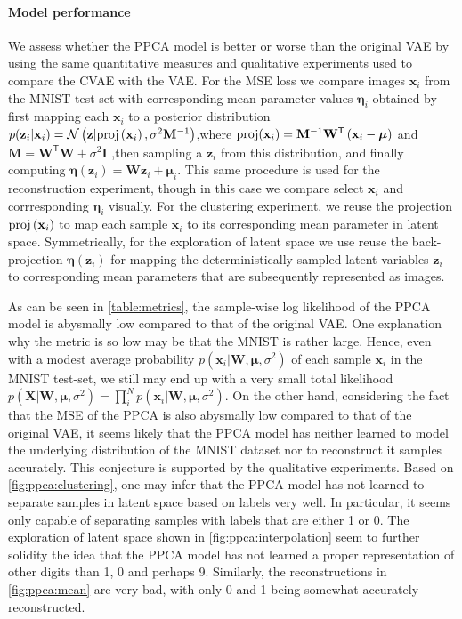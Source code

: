 \paragraph{Model performance}
We assess whether the PPCA model is better or worse than the original VAE by using the same quantitative measures and qualitative experiments used to compare the CVAE with the VAE\@. For the MSE loss we compare images $\mathbf{x}_i$ from the MNIST test set with corresponding mean parameter values $\bm{\eta}_i$ obtained by first mapping each $\mathbf{x}_i$ to a posterior distribution $p(\mathbf{z}_i|\mathbf{x}_i) = \mathcal{N}\left (\mathbf{z}| \text{proj}\left (\mathbf{x}_i\right), \sigma^2 \mathbf{M}^{-1}\right)$,where  $\text{proj}(\mathbf{x}_i) = \mathbf{M}^{-1} \mathbf{W}^{\mathsf{T}}\left (\mathbf{x}_i - \bm{\mu}\right)$ and $\mathbf{M} = \mathbf{W}^{\mathsf{T}}\mathbf{W} + \sigma^2 \mathbf{I}$ ,then sampling a $\mathbf{z}_i$ from this distribution, and finally computing $\bm{\eta}(\mathbf{z}_i) = \mathbf{W}\mathbf{z}_i + \bm{\mu}_i$. This same procedure is used for the reconstruction experiment, though in this case we compare select $\mathbf{x}_i$ and corrresponding $\bm{\eta}_i$ visually. For the clustering experiment, we reuse the projection  $\text{proj}\left (\mathbf{x}_i\right)$ to map each sample $\mathbf{x}_i$ to its corresponding mean parameter in latent space. Symmetrically, for the exploration of latent space we use reuse the back-projection $\bm{\eta}(\mathbf{z}_i)$ for mapping the deterministically sampled latent variables $\mathbf{z}_i$ to corresponding mean parameters that are subsequently represented as images.

As can be seen in \cref{table:metrics}, the sample-wise log likelihood of the PPCA model is abysmally low compared to that of the original VAE\@. One explanation why the metric is so low may be that the MNIST is rather large. Hence, even with a modest average probability $p(\mathbf{x}_i | \mathbf{W}, \bm{\mu}, \sigma^2)$ of each sample $\mathbf{x}_i$ in the MNIST test-set, we still may end up with a very small total likelihood $p(\mathbf{X}|\mathbf{W}, \bm{\mu}, \sigma^2 ) = \prod_{i}^{N}p(\mathbf{x}_i | \mathbf{W}, \bm{\mu}, \sigma^2)$. On the other hand, considering the fact that the MSE of the PPCA is also abysmally low compared to that of the original VAE, it seems likely that the PPCA model has neither learned to model the underlying distribution of the MNIST dataset nor to reconstruct it samples accurately. This conjecture is supported by the qualitative experiments. Based on \cref{fig:ppca:clustering}, one may infer that the PPCA model has not learned to separate samples in latent space based on labels very well. In particular, it seems only capable of separating samples with labels that are either 1 or 0. The exploration of latent space shown in \cref{fig:ppca:interpolation} seem to further solidity the idea that the PPCA model has not learned a proper representation of other digits than 1, 0 and perhaps 9. Similarly, the reconstructions in \cref{fig:ppca:mean} are very bad, with only 0 and 1 being somewhat accurately reconstructed.

